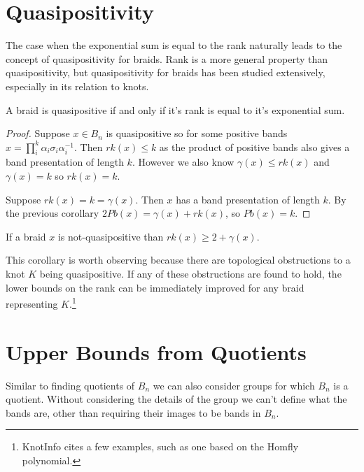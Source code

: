 \documentclass[12pt]{thesis}
\begin{document}
\section{Quasipositivity}

The case when the exponential sum is equal to the rank 
naturally leads to the concept of quasipositivity for braids.
Rank is a more general property than quasipositivity, but quasipositivity
for braids has been studied extensively, especially in its relation to knots.

\begin{proposition}
    \label{quasipositive-from-rank}
    A braid is quasipositive if and only if it's rank is equal to it's exponential sum.
\end{proposition}

\begin{proof}

    Suppose $x \in B_{n}$ is quasipositive
    so for some positive bands $x = \prod_{i}^{k} \alpha_{i} \sigma_{i} \alpha_{i}^{-1}$.
    Then $rk(x) \leq k$ as the product of positive bands also gives a band presentation of length $k$.
    However we also know $\gamma(x) \leq rk(x)$ and $\gamma(x) = k$ so 
    $rk(x) = k$.

    Suppose $rk(x) = k = \gamma(x)$. Then $x$ has a band presentation of length $k$.
    By the previous corollary $2Pb(x) = \gamma(x) + rk(x)$,
    so $Pb(x) = k$.
\end{proof}

\begin{corollary}
    If a braid $x$ is not-quasipositive than $rk(x) \geq 2 + \gamma(x)$.
\end{corollary}

This corollary is worth observing because there are topological obstructions
to a knot $K$ being quasipositive.
If any of these obstructions are found to hold, the lower bounds
on the rank can be immediately improved for any braid
representing $K$.\footnote{ KnotInfo\cite{knotinfo} cites a few examples,
such as one based on the Homfly polynomial. }

\section{Upper Bounds from Quotients}

Similar to finding quotients of $B_{n}$
we can also consider groups for which $B_{n}$ is a quotient.
Without considering the details of the group
we can't define what the bands are,
other than requiring their images
to be bands in $B_{n}$.
\end{document}
